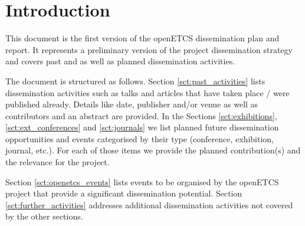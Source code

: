 ﻿\section{Introduction}

This document is the first version of the openETCS dissemination plan and report. It represents a preliminary version of the project dissemination strategy and covers past and as well as planned dissemination activities.

The document is structured as follows. Section \ref{sct:past_activities} lists dissemination activities such as talks and articles that have taken place / were published already. Details like date, publisher and/or venue as well as contributors and an abstract are provided. In the Sections \ref{sct:exhibitions}, \ref{sct:ext_conferences} and \ref{sct:journals} we list planned future dissemination opportunities and events categorised by their type (conference, exhibition, journal, etc.). For each of those items we provide the planned contribution(s) and the relevance for the project.

Section \ref{sct:openetcs_events} lists events to be organised by the openETCS project that provide a significant dissemination potential. Section \ref{sct:further_activities} addresses additional dissemination activities not covered by the other sections.
